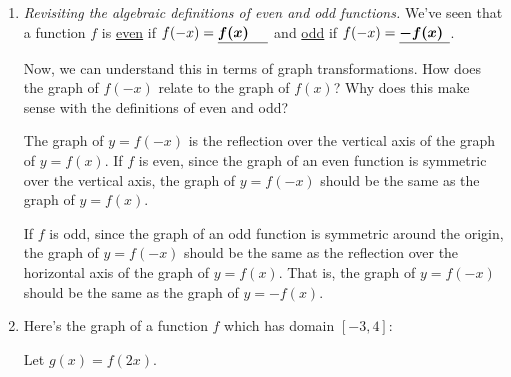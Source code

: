 \documentclass{article}
\begin{document}
\begin{enumerate}
\begin{enumerate}[resume]
    \end{enumerate}
  \probonly{\end{multicols}}

  \pspace{1.5in}

\item  

  \begin{problem}[0.4in]
    \emph{Revisiting the algebraic definitions of even and odd
      functions.} We've seen that a function $f$ is \uline{even} if
    $f(-x) = \fitb{0.5in}{f(x)}$ and \uline{odd} if
    $f(-x) = \fitb{0.5in}{-f(x)}$.

    Now, we can understand this in terms of graph transformations. How
    does the graph of $f(-x)$ relate to the graph of $f(x)$? Why does
    this make sense with the definitions of even and odd?
  \end{problem}

  \begin{solution}
    The graph of $y=f(-x)$ is the reflection over the vertical axis of the graph of $y=f(x)$.
    If $f$ is even, since the graph of an even function is symmetric over the vertical axis,
    the graph of $y=f(-x)$ should be the same as the graph of $y=f(x)$. 
    
    If $f$ is odd, since the
    graph of an odd function is symmetric around the origin, the graph of $y=f(-x)$ should be
    the same as the reflection over the horizontal axis of the graph of $y=f(x)$. That is,
    the graph of $y=f(-x)$ should be the same as the graph of $y=-f(x)$. 
  \end{solution}

  \pspace{\newpage}

\item  \label{understanding-horizontal-stretch}


  Here's the graph of a function $f$ which has domain $[-3, 4]$:
  \begin{center}    
  \end{center}
  Let $g(x) = f(2x)$.


\end{enumerate}
\end{document}
